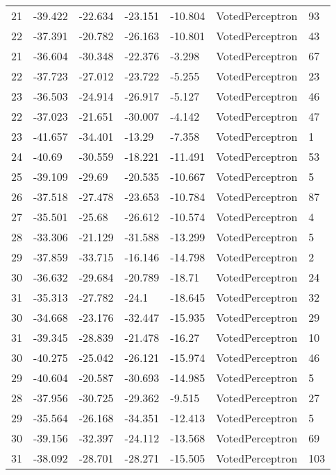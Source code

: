 \begin{tabular}{lllllll}
21 & -39.422 & -22.634 & -23.151 & -10.804 &    VotedPerceptron &   93 \\
22 & -37.391 & -20.782 & -26.163 & -10.801 &    VotedPerceptron &   43 \\
21 & -36.604 & -30.348 & -22.376 &  -3.298 &    VotedPerceptron &   67 \\
22 & -37.723 & -27.012 & -23.722 &  -5.255 &    VotedPerceptron &   23 \\
23 & -36.503 & -24.914 & -26.917 &  -5.127 &    VotedPerceptron &   46 \\
22 & -37.023 & -21.651 & -30.007 &  -4.142 &    VotedPerceptron &   47 \\
23 & -41.657 & -34.401 &  -13.29 &  -7.358 &    VotedPerceptron &    1 \\
24 &  -40.69 & -30.559 & -18.221 & -11.491 &    VotedPerceptron &   53 \\
25 & -39.109 &  -29.69 & -20.535 & -10.667 &    VotedPerceptron &    5 \\
26 & -37.518 & -27.478 & -23.653 & -10.784 &    VotedPerceptron &   87 \\
27 & -35.501 &  -25.68 & -26.612 & -10.574 &    VotedPerceptron &    4 \\
28 & -33.306 & -21.129 & -31.588 & -13.299 &    VotedPerceptron &    5 \\
29 & -37.859 & -33.715 & -16.146 & -14.798 &    VotedPerceptron &    2 \\
30 & -36.632 & -29.684 & -20.789 &  -18.71 &    VotedPerceptron &   24 \\
31 & -35.313 & -27.782 &   -24.1 & -18.645 &    VotedPerceptron &   32 \\
30 & -34.668 & -23.176 & -32.447 & -15.935 &    VotedPerceptron &   29 \\
31 & -39.345 & -28.839 & -21.478 &  -16.27 &    VotedPerceptron &   10 \\
30 & -40.275 & -25.042 & -26.121 & -15.974 &    VotedPerceptron &   46 \\
29 & -40.604 & -20.587 & -30.693 & -14.985 &    VotedPerceptron &    5 \\
28 & -37.956 & -30.725 & -29.362 &  -9.515 &    VotedPerceptron &   27 \\
29 & -35.564 & -26.168 & -34.351 & -12.413 &    VotedPerceptron &    5 \\
30 & -39.156 & -32.397 & -24.112 & -13.568 &    VotedPerceptron &   69 \\
31 & -38.092 & -28.701 & -28.271 & -15.505 &    VotedPerceptron &  103 \\

\end{tabular}
